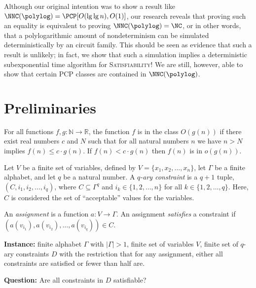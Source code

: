 \documentclass{article}
\begin{document}
Although our original intention was to show a result like $\NNC(\polylog) = \PCP[O(\lg \lg n), O(1)]$, our research reveals that proving such an equality is equivalent to proving $\NNC(\polylog) = \NC$, or in other words, that a polylogarithmic amount of nondeterminism can be simulated deterministically by an \NC{} circuit family.
This should be seen as evidence that such a result is unlikely; in fact, we show that such a simulation implies a deterministic subexponential time algorithm for \textsc{Satisfiability}!
We are still, however, able to show that certain PCP classes are contained in $\NNC(\polylog)$.

\section{Preliminaries}

\begin{definition}
  For all functions $f, g \colon \mathbb{N} \to \mathbb{R}$, the function $f$ is in the class $O(g(n))$ if there exist real numbers $c$ and $N$ such that for all natural numbers $n$ we have $n > N$ implies $f(n) \leq c \cdot g(n)$.
  If $f(n) < c \cdot g(n)$ then $f(n)$ is in $o(g(n))$.
\end{definition}

\begin{definition}
  Let $V$ be a finite set of variables, defined by $V = \{x_1, x_2, \dotsc, x_n\}$, let $\Gamma$ be a finite alphabet, and let $q$ be a natural number.
  A \emph{$q$-ary constraint} is a $q + 1$ tuple, $(C, i_1, i_2, \dotsc, i_q)$, where $C \subseteq \Gamma^q$ and $i_k \in \{1, 2, \dotsc, n\}$ for all $k \in \{1, 2, \ldots, q\}$.
  Here, $C$ is considered the set of ``acceptable'' values for the variables.

  An \emph{assignment} is a function $a \colon V \to \Gamma$.
  An assignment \emph{satisfies} a constraint if $(a(v_{i_1}), a(v_{i_2}), \dotsc, a(v_{i_q})) \in C$.
\end{definition}

\begin{definition}
  \mbox{}

  \textbf{Instance:} finite alphabet $\Gamma$ with $|\Gamma| > 1$, finite set of variables $V$, finite set of $q$-ary constraints $D$ with the restriction that for any assignment, either all constraints are satisfied or fewer than half are.

  \textbf{Question:} Are all constraints in $D$ satisfiable?
\end{definition}
\end{document}
